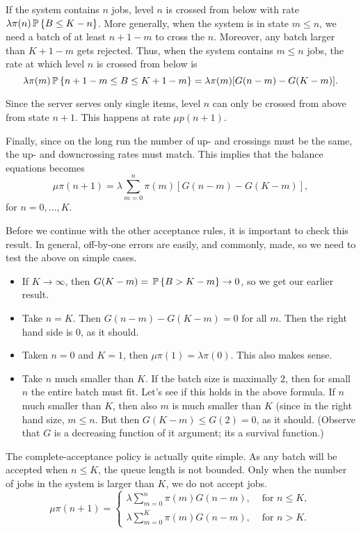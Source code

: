 \begin{question}
\begin{solution}
  If the system contains $n$ jobs,  level $n$ is
  crossed from below with rate $\lambda \pi(n) \P{B \leq K-n}$.  More generally,
  when the system is in state $m\leq n$, we need a batch of at least
  $n+1-m$ to cross the $n$. Moreover, any batch larger than $K+1-m$
  gets rejected. Thus, when the system contains $m \leq n $ jobs, the
  rate at which level $n$ is crossed from below is
  \begin{equation*}
  \lambda \pi(m) \P{n+1-m\leq B \leq K+1-m} = \lambda \pi(m)
  [G(n-m)-G(K-m)].
  \end{equation*}

  Since the server serves only single items, level $n$ can only be
  crossed from above from state $n+1$. This happens at rate $\mu p(n+1)$. 

  Finally, since on the long run the number of up- and crossings must
  be the same, the up- and downcrossing rates must match. This implies
  that the balance equations becomes
  \begin{equation*}
    \mu \pi(n+1) = \lambda \sum_{m=0}^n \pi(m)   [G(n-m)-G(K-m)],
  \end{equation*}
  for $n=0,\ldots, K$. 

  Before we continue with the other acceptance rules, it is important
  to check this result.  In general, off-by-one errors are easily, and
  commonly, made, so we need to test the above on simple cases. 
  \begin{itemize}
  \item  If $K\to \infty$, then $G(K-m)=\P{B>K-m}\to 0$, so we get our earlier result. 
  \item Take $n=K$. Then $G(n-m)-G(K-m)=0$ for all $m$. Then the right hand side is 0, as it should.
  \item Taken $n=0$ and $K=1$, then $\mu \pi(1)= \lambda \pi(0)$. This also makes sense. 
  \item Take $n$ much smaller than $K$. If the batch size is maximally
    $2$, then for small $n$ the entire batch must fit. Let's see if
    this holds in the above formula. If $n$ much smaller than $K$,
    then also $m$ is much smaller than $K$ (since in the right hand
    size, $m\leq n$. But then $G(K-m) \leq G(2) = 0$, as it
    should. (Observe that $G$ is a decreasing function of it argument;
    its a survival function.)
  \end{itemize}

  The complete-acceptance policy is actually quite simple. As any
  batch will be accepted when $n\leq K$, the queue length is not
  bounded.  Only when the number of jobs in the system is larger than
  $K$, we do not accept jobs. 
  \begin{equation*}
    \mu \pi(n+1) = 
    \begin{cases}
      \lambda \sum_{m=0}^n \pi(m) G(n-m), & \text{ for } n\leq K,\\
      \lambda \sum_{m=0}^K \pi(m) G(n-m), & \text{ for } n> K.
    \end{cases}
  \end{equation*}


\end{solution}
\end{question}
